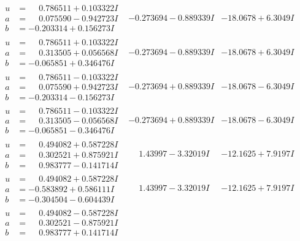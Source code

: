 \documentclass[1p]{elsarticle_modified}
\theoremstyle{definition}
\begin{document}
$$\begin{array}{c|c|c}
\begin{aligned}
u &= \phantom{-}0.786511 + 0.103322 I \\
a &= \phantom{-}0.075590 - 0.942723 I \\
b &= -0.203314 + 0.156273 I\end{aligned}
 & -0.273694 - 0.889339 I & -18.0678 + 6.3049 I \\ \hline\begin{aligned}
u &= \phantom{-}0.786511 + 0.103322 I \\
a &= \phantom{-}0.313505 + 0.056568 I \\
b &= -0.065851 + 0.346476 I\end{aligned}
 & -0.273694 - 0.889339 I & -18.0678 + 6.3049 I \\ \hline\begin{aligned}
u &= \phantom{-}0.786511 - 0.103322 I \\
a &= \phantom{-}0.075590 + 0.942723 I \\
b &= -0.203314 - 0.156273 I\end{aligned}
 & -0.273694 + 0.889339 I & -18.0678 - 6.3049 I \\ \hline\begin{aligned}
u &= \phantom{-}0.786511 - 0.103322 I \\
a &= \phantom{-}0.313505 - 0.056568 I \\
b &= -0.065851 - 0.346476 I\end{aligned}
 & -0.273694 + 0.889339 I & -18.0678 - 6.3049 I \\ \hline\begin{aligned}
u &= \phantom{-}0.494082 + 0.587228 I \\
a &= \phantom{-}0.302521 + 0.875921 I \\
b &= \phantom{-}0.983777 - 0.141714 I\end{aligned}
 & \phantom{-}1.43997 - 3.32019 I & -12.1625 + 7.9197 I \\ \hline\begin{aligned}
u &= \phantom{-}0.494082 + 0.587228 I \\
a &= -0.583892 + 0.586111 I \\
b &= -0.304504 - 0.604439 I\end{aligned}
 & \phantom{-}1.43997 - 3.32019 I & -12.1625 + 7.9197 I \\ \hline\begin{aligned}
u &= \phantom{-}0.494082 - 0.587228 I \\
a &= \phantom{-}0.302521 - 0.875921 I \\
b &= \phantom{-}0.983777 + 0.141714 I\end{aligned}

\end{array}$$
\end{document}
